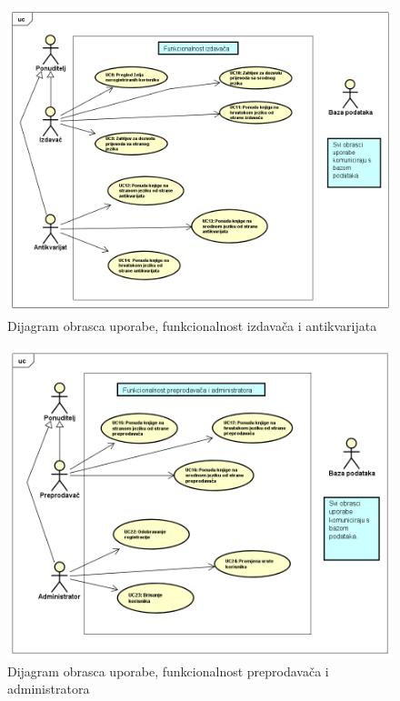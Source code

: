 					\eject
					
					\begin{figure}[H]
						\includegraphics[width=\textwidth]{dijagrami/UseCaseD2.PNG} %
						\centering
						\caption{Dijagram obrasca uporabe, funkcionalnost izdavača i antikvarijata}
						\label{fig:promjene2}
					\end{figure}
					
					\eject
					
					\begin{figure}[H]
						\includegraphics[width=\textwidth]{dijagrami/UseCaseD3.PNG} %
						\centering
						\caption{Dijagram obrasca uporabe, funkcionalnost preprodavača i administratora}
						\label{fig:promjene3}
					\end{figure}
					
